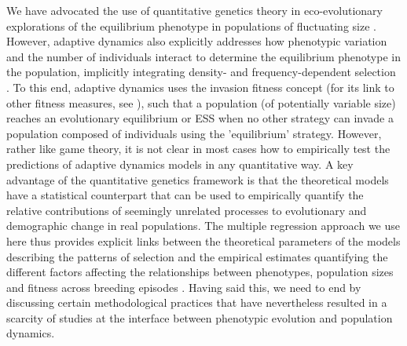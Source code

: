 \documentclass{article}
\begin{document}
We have advocated the use of quantitative genetics theory in eco-evolutionary explorations of the equilibrium phenotype in populations of fluctuating size \citep{Engen2013, Engen2020, Lande2017, Lande2009a}. However, adaptive dynamics also explicitly addresses how phenotypic variation and the number of individuals interact to determine the equilibrium phenotype in the population, implicitly integrating density- and frequency-dependent selection \citep{McGill2007}. To this end, adaptive dynamics uses the invasion fitness concept (for its link to other fitness measures, see \cite{Lehmann2016}), such that a population (of potentially variable size) reaches an evolutionary equilibrium or ESS when no other strategy can invade a population composed of individuals using the 'equilibrium' strategy. However, rather like game theory, it is not clear in most cases how to empirically test the predictions of adaptive dynamics models in any quantitative way. A key advantage of the quantitative genetics framework is that the theoretical models have a statistical counterpart that can be used to empirically quantify the relative contributions of seemingly unrelated processes to evolutionary and demographic change in real populations. The multiple regression approach we use here thus provides explicit links between the theoretical parameters of the models describing the patterns of selection and the empirical estimates quantifying the different factors affecting the relationships between phenotypes, population sizes and fitness across breeding episodes \citep{Lande1983, Queller1992, Wolf1999SocialSelection, Heisler1987, Goodnight1992}. Having said this, we need to end by discussing certain methodological practices that have nevertheless resulted in a scarcity of studies at the interface between phenotypic evolution and population dynamics.
\end{document}
